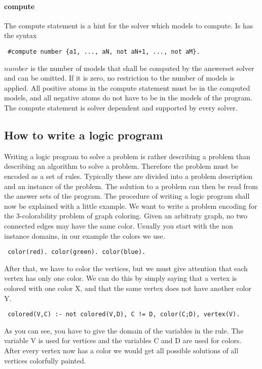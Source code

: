 \documentclass[a4paper,10pt]{article}
\begin{document}
\paragraph{compute}
The compute statement is a hint for the solver which models to compute.
Is has the syntax
\begin{verbatim}
 #compute number {a1, ..., aN, not aN+1, ..., not aM}.
\end{verbatim}
$number$ is the number of models that shall be computed by the answerset solver and can be omitted. If it is zero, no restriction to the number of models is applied.
All positive atoms in the compute statement must be in the computed models, and all negative atoms do not have to be in the models of the program.
The compute statement is solver dependent and supported by every solver.

\subsection{How to write a logic program}
Writing a logic program to solve a problem is rather describing a problem than describing an algorithm to solve a problem.
Therefore the problem must be encoded as a set of rules.
Typically these are divided into a problem description and an instance of the problem.
The solution to a problem can then be read from the answer sets of the program.
The procedure of writing a logic program shall now be explained with a little example.
We want to write a problem encoding for the 3-colorability problem of graph coloring.
Given an arbitraty graph, no two connected edges may have the same color.
\newline
Usually you start with the non instance domains, in our example the colors we use.
\begin{verbatim}
 color(red). color(green). color(blue).
\end{verbatim}
After that, we have to color the vertices, but we must give attention that each vertex has only one color.
We can do this by simply saying that a vertex is colored with one color X, and that the same vertex does not have another color Y.
\begin{verbatim}
 colored(V,C) :- not colored(V,D), C != D, color(C;D), vertex(V).
\end{verbatim}
As you can see, you have to give the domain of the variables in the rule.
The variable V is used for vertices and the variables C and D are used for colors.
After every vertex now has a color we would get all possible solutions of all vertices colorfully painted.
\end{document}
